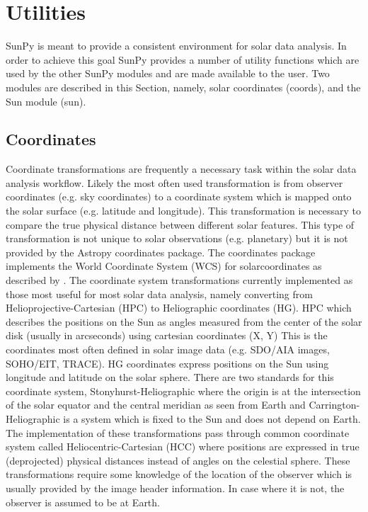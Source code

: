 \section{Utilities}
SunPy is meant to provide a consistent environment for solar data analysis. In 
order to achieve this goal SunPy provides a number of utility functions which 
are used by the other SunPy modules and are made available to the user. Two 
modules are described in this Section, namely, solar coordinates (coords), and 
the Sun module (sun). 
	
\subsection{Coordinates}
Coordinate transformations are frequently a necessary task within the solar 
data analysis workflow. Likely the most often used transformation is from 
observer coordinates (e.g. sky coordinates) to a coordinate system which is 
mapped onto the solar surface (e.g. latitude and longitude). This 
transformation is necessary to compare the true physical distance between 
different solar features. This type of transformation is not unique
to solar observations (e.g. planetary) but it is not provided by the Astropy 
coordinates package. The coordinates package implements the World Coordinate 
System (WCS) for solarcoordinates as described by \cite{Thompson2000}. The 
coordinate system transformations currently implemented as those most useful 
for most solar data analysis, namely converting from Helioprojective-Cartesian 
(HPC) to Heliographic coordinates (HG). HPC which describes the positions on 
the Sun as angles measured from the center of the solar disk (usually in 
arcseconds) using cartesian coordinates (X, Y) This is the coordinates 
most often defined in solar image data (e.g. SDO/AIA images, SOHO/EIT, TRACE). 
HG coordinates express positions on the Sun using longitude and latitude on 
the 
solar sphere. There are two standards for this coordinate system, 
Stonyhurst-Heliographic where the origin is at the intersection of the solar 
equator and the central meridian as seen from Earth and 
Carrington-Heliographic 
is a system which is fixed to the Sun and does not depend on Earth. The 
implementation of these transformations pass through common coordinate system 
called Heliocentric-Cartesian (HCC) where positions are expressed in true 
(deprojected) physical distances instead of angles on the celestial sphere.
These transformations require some knowledge of the location of the observer 
which is usually provided by the image header information. In case where it is 
not, the observer is assumed to be at Earth.


